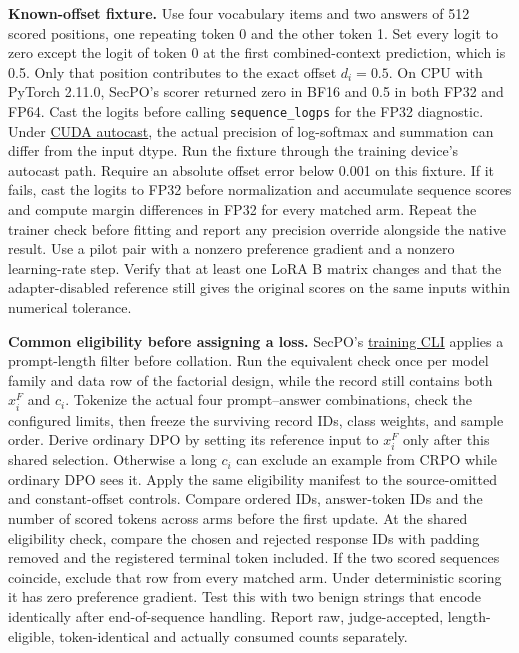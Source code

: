 \documentclass[11pt]{article}
\begin{document}
\textbf{Known-offset fixture.} Use four vocabulary items and two answers of 512 scored positions, one repeating token 0 and the other token 1. Set every logit to zero except the logit of token 0 at the first combined-context prediction, which is 0.5. Only that position contributes to the exact offset $d_i=0.5$. On CPU with PyTorch 2.11.0, SecPO's scorer returned zero in BF16 and 0.5 in both FP32 and FP64. Cast the logits before calling \texttt{sequence\_logps} for the FP32 diagnostic. Under \href{https://docs.pytorch.org/docs/2.11/amp.html#cuda-op-specific-behavior}{CUDA autocast}, the actual precision of log-softmax and summation can differ from the input dtype. Run the fixture through the training device's autocast path. Require an absolute offset error below 0.001 on this fixture. If it fails, cast the logits to FP32 before normalization and accumulate sequence scores and compute margin differences in FP32 for every matched arm. Repeat the trainer check before fitting and report any precision override alongside the native result. Use a pilot pair with a nonzero preference gradient and a nonzero learning-rate step. Verify that at least one LoRA B matrix changes and that the adapter-disabled reference still gives the original scores on the same inputs within numerical tolerance.

\textbf{Common eligibility before assigning a loss.} SecPO's \href{https://github.com/Sizhe-Chen/SecPO/blob/da0372a0e598badf4e51c98c175a962147cac2ac/src/secpo/training_cli.py}{training CLI} applies a prompt-length filter before collation. Run the equivalent check once per model family and data row of the factorial design, while the record still contains both $x_i^F$ and $c_i$. Tokenize the actual four prompt--answer combinations, check the configured limits, then freeze the surviving record IDs, class weights, and sample order. Derive ordinary DPO by setting its reference input to $x_i^F$ only after this shared selection. Otherwise a long $c_i$ can exclude an example from CRPO while ordinary DPO sees it. Apply the same eligibility manifest to the source-omitted and constant-offset controls. Compare ordered IDs, answer-token IDs and the number of scored tokens across arms before the first update. At the shared eligibility check, compare the chosen and rejected response IDs with padding removed and the registered terminal token included. If the two scored sequences coincide, exclude that row from every matched arm. Under deterministic scoring it has zero preference gradient. Test this with two benign strings that encode identically after end-of-sequence handling. Report raw, judge-accepted, length-eligible, token-identical and actually consumed counts separately.
\end{document}
